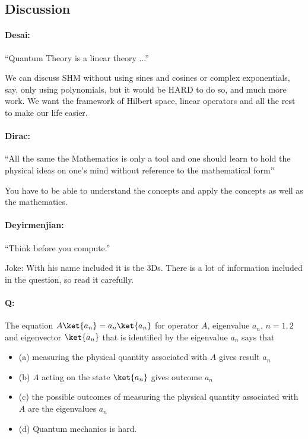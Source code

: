 %
%

\subsection{Discussion}

\paragraph{Desai:} ``Quantum Theory is a linear theory ...''

We can discuss SHM without using sines and cosines or complex exponentials, say, only using polynomials, but it would be HARD to do so, and much more work.  We want the framework of Hilbert space, linear operators and all the rest to make our life easier.

\paragraph{Dirac:} ``All the same the Mathematics is only a tool and one should learn to hold the physical ideas on one's mind without reference to the mathematical form''

You have to be able to understand the concepts and apply the concepts as well as the mathematics.

\paragraph{Deyirmenjian:} ``Think before you compute.''

Joke: With his name included it is the 3Ds.  There is a lot of information included in the question, so read it carefully.

\paragraph{Q:} The equation \(A \ket{a_n} = a_n \ket{a_n}\) for operator \(A\), eigenvalue \(a_n\), \(n = 1,2\) and eigenvector \(\ket{a_n}\) that is identified by the eigenvalue \(a_n\) says that

\begin{itemize}
\item (a) measuring the physical quantity associated with \(A\) gives result \(a_n\)
\item (b) \(A\) acting on the state \(\ket{a_n}\) gives outcome \(a_n\)
\item (c) the possible outcomes of measuring the physical quantity associated with \(A\) are the eigenvalues \(a_n\)
\item (d) Quantum mechanics is hard.
\end{itemize}

